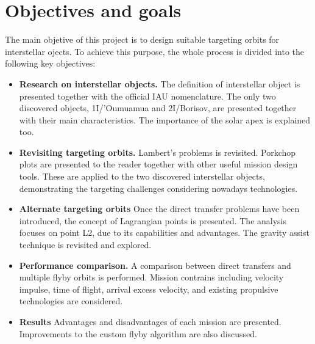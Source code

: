 \section{Objectives and goals}

The main objetive of this project is to design suitable targeting orbits for
interstellar ojects. To achieve this purpose, the whole process is divided
into the following key objectives:

\begin{itemize}

  \item \textbf{Research on interstellar objects.}
        The definition of interstellar object is presented together with the
        official IAU nomenclature. The only two discovered objects,
        1I/'Oumuamua and 2I/Borisov, are presented together with their main
        characteristics. The importance of the solar apex is explained
        too.

  \item \textbf{Revisiting targeting orbits.}
        Lambert's problems is revisited. Porkchop plots are presented to the
        reader together with other useful mission design tools. These are
        applied to the two discovered interstellar objects, demonstrating the
        targeting challenges considering nowadays technologies.

  \item \textbf{Alternate targeting orbits}
        Once the direct transfer problems have been introduced, the concept of
        Lagrangian points is presented. The analysis focuses on point L2, due
        to its capabilities and advantages. The gravity assist technique is
        revisited and explored.

  \item \textbf{Performance comparison.}
        A comparison between direct transfers and multiple flyby orbits is
        performed. Mission contrains including velocity impulse, time of
        flight, arrival excess velocity, and existing propulsive technologies
        are considered.

  \item \textbf{Results}
        Advantages and disadvantages of each mission are presented. Improvements
        to the custom flyby algorithm are also discussed.
\end{itemize}
